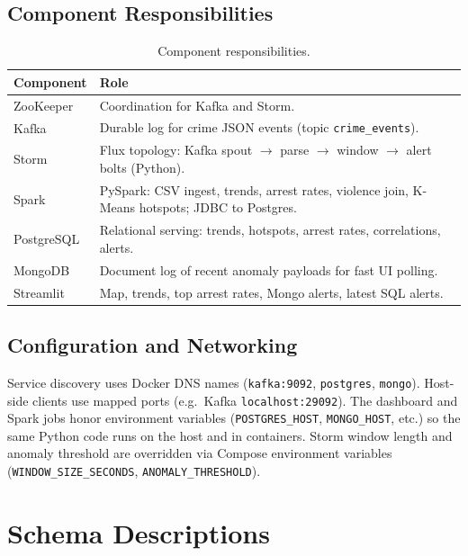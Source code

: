 \documentclass[12pt,a4paper]{article}
\begin{document}
\subsection{Component Responsibilities}
\begin{table}[ht]
\centering
\small
\begin{tabular}{@{}p{3.2cm}p{10.5cm}@{}}
\toprule
\textbf{Component} & \textbf{Role} \\
\midrule
ZooKeeper & Coordination for Kafka and Storm. \\
Kafka & Durable log for crime JSON events (topic \texttt{crime\_events}). \\
Storm & Flux topology: Kafka spout $\rightarrow$ parse $\rightarrow$ window $\rightarrow$ alert bolts (Python). \\
Spark & PySpark: CSV ingest, trends, arrest rates, violence join, K-Means hotspots; JDBC to Postgres. \\
PostgreSQL & Relational serving: trends, hotspots, arrest rates, correlations, alerts. \\
MongoDB & Document log of recent anomaly payloads for fast UI polling. \\
Streamlit & Map, trends, top arrest rates, Mongo alerts, latest SQL alerts. \\
\bottomrule
\end{tabular}
\caption{Component responsibilities.}
\label{tab:components}
\end{table}

\subsection{Configuration and Networking}
Service discovery uses Docker DNS names (\texttt{kafka:9092}, \texttt{postgres}, \texttt{mongo}). Host-side clients use mapped ports (e.g.\ Kafka \texttt{localhost:29092}). The dashboard and Spark jobs honor environment variables (\texttt{POSTGRES\_HOST}, \texttt{MONGO\_HOST}, etc.) so the same Python code runs on the host and in containers. Storm window length and anomaly threshold are overridden via Compose environment variables (\texttt{WINDOW\_SIZE\_SECONDS}, \texttt{ANOMALY\_THRESHOLD}).

\section{Schema Descriptions}
\label{sec:schema}
\end{document}
